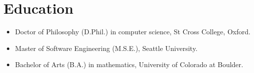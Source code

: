 \section*{Education}
\vspace{-2mm}

\begin{itemize}
    \item Doctor of Philosophy (D.Phil.) in computer science, St Cross College, Oxford.\vspace{-1mm}
	\item Master of Software Engineering (M.S.E.), Seattle University.\vspace{-1mm}
	\item Bachelor of Arts (B.A.) in mathematics, University of Colorado at Boulder.
\end{itemize}

